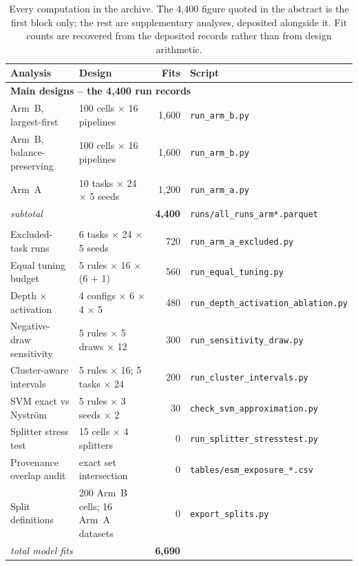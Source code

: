 \documentclass[11pt,a4paper]{article}
\begin{document}
\begin{table}[htbp]\centering\small
\caption{Every computation in the archive. The 4{,}400 figure quoted in the abstract is the
first block only; the rest are supplementary analyses, deposited alongside it. Fit counts
are recovered from the deposited records rather than from design arithmetic.}
\label{tab:release}
\footnotesize
\begin{tabular}{llr>{\raggedright\arraybackslash}p{}}
\toprule
Analysis & Design & Fits & Script \\
\midrule
\multicolumn{4}{l}{\textbf{Main designs -- the 4{,}400 run records}} \\
Arm~B, largest-first      & 100 cells $\times$ 16 pipelines       & 1{,}600 & \texttt{run\_arm\_b.py} \\
Arm~B, balance-preserving & 100 cells $\times$ 16 pipelines       & 1{,}600 & \texttt{run\_arm\_b.py} \\
Arm~A                     & 10 tasks $\times$ 24 $\times$ 5 seeds & 1{,}200 & \texttt{run\_arm\_a.py} \\
\cmidrule(lr){1-4}
\multicolumn{2}{l}{\emph{subtotal}} & \textbf{4{,}400} & \texttt{runs/all\_runs\_arm*.parquet} \\
\addlinespace
\multicolumn{4}{l}{\textbf{Supplementary analyses -- also deposited}} \\
Excluded-task runs        & 6 tasks $\times$ 24 $\times$ 5 seeds  & 720 & \texttt{run\_arm\_a\_excluded.py} \\
Equal tuning budget       & 5 rules $\times$ 16 $\times$ (6 + 1)  & 560 & \texttt{run\_equal\_tuning.py} \\
Depth $\times$ activation & 4 configs $\times$ 6 $\times$ 4 $\times$ 5 & 480 &
  \texttt{run\_depth\_\allowbreak activation\_\allowbreak ablation.py} \\
Negative-draw sensitivity & 5 rules $\times$ 5 draws $\times$ 12  & 300 & \texttt{run\_sensitivity\_draw.py} \\
Cluster-aware intervals   & 5 rules $\times$ 16; 5 tasks $\times$ 24 & 200 & \texttt{run\_cluster\_intervals.py} \\
SVM exact vs Nystr\"om    & 5 rules $\times$ 3 seeds $\times$ 2   &  30 & \texttt{check\_svm\_approximation.py} \\
Splitter stress test      & 15 cells $\times$ 4 splitters         &   0 & \texttt{run\_splitter\_stresstest.py} \\
Provenance overlap audit  & exact set intersection                &   0 & \texttt{tables/esm\_exposure\_*.csv} \\
Split definitions         & 200 Arm~B cells; 16 Arm~A datasets    &   0 & \texttt{export\_splits.py} \\
\cmidrule(lr){1-4}
\multicolumn{2}{l}{\emph{total model fits}} & \textbf{6{,}690} & \\
\bottomrule
\end{tabular}


\end{table}
\end{document}
